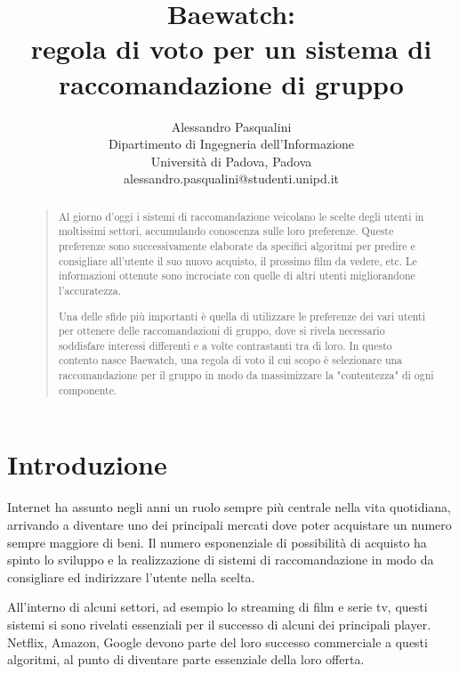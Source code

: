 \documentclass[letterpaper]{article}
\begin{document}
%
\title{Baewatch:\\regola di voto per un sistema di raccomandazione di gruppo}
\author{Alessandro Pasqualini\\
Dipartimento di Ingegneria dell'Informazione\\
Università di Padova, Padova\\
alessandro.pasqualini@studenti.unipd.it\\
}
\maketitle
\begin{abstract}
\begin{quote}
Al giorno d'oggi i sistemi di raccomandazione veicolano le scelte degli utenti in moltissimi settori, accumulando conoscenza sulle loro preferenze. Queste preferenze sono successivamente elaborate da specifici algoritmi per predire e consigliare all'utente il suo nuovo acquisto, il prossimo film da vedere, etc. Le informazioni ottenute sono incrociate con quelle di altri utenti migliorandone l'accuratezza.

Una delle sfide più importanti è quella di utilizzare le preferenze dei vari utenti per ottenere delle raccomandazioni di gruppo, dove si rivela necessario soddisfare interessi differenti e a volte contrastanti tra di loro. In questo contento nasce Baewatch, una regola di voto il cui scopo è selezionare una raccomandazione per il gruppo in modo da massimizzare la "contentezza" di ogni componente.

\end{quote}
\end{abstract}

\section{Introduzione}
Internet ha assunto negli anni un ruolo sempre più centrale nella vita quotidiana, arrivando a diventare uno dei principali mercati dove poter acquistare un numero sempre maggiore di beni. Il numero esponenziale di possibilità di acquisto ha spinto lo sviluppo e la realizzazione di sistemi di raccomandazione in modo da consigliare ed indirizzare l'utente nella scelta.

All'interno di alcuni settori, ad esempio lo streaming di film e serie tv, questi sistemi si sono rivelati essenziali per il successo di alcuni dei principali player. Netflix, Amazon, Google devono parte del loro successo commerciale a questi algoritmi, al punto di diventare parte essenziale della loro offerta.
\end{document}
